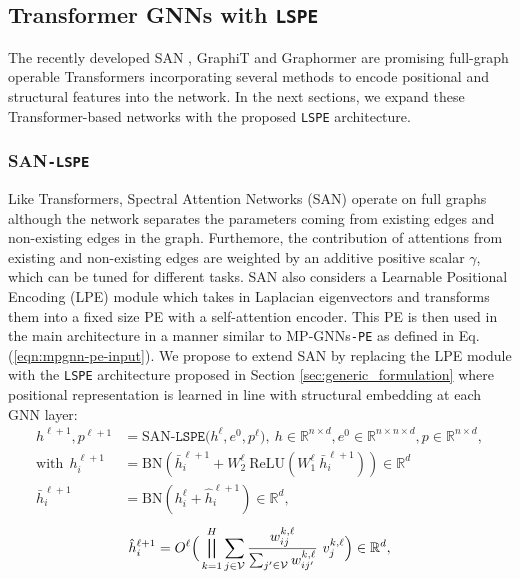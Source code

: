 \documentclass{article} \usepackage{iclr2021_conference,times}
\begin{document}
\subsection{Transformer GNNs with \texttt{LSPE}}
\label{sec:transformer_lspe}

The recently developed SAN \citep{kreuzer2021rethinking}, GraphiT \citep{mialon2021graphit} and Graphormer \citep{ying2021transformers} are promising full-graph operable Transformers incorporating several methods to encode positional and structural features into the network. In the next sections, we expand these Transformer-based networks with the proposed \texttt{LSPE} architecture.



\subsubsection{SAN\texttt{-LSPE}}
\label{sec:san_lspe}
Like Transformers, Spectral Attention Networks (SAN) \citep{kreuzer2021rethinking} operate on full graphs although the network separates the parameters coming from existing edges and non-existing edges in the graph. Furthemore, the contribution of attentions from existing and non-existing edges are weighted by an additive positive scalar $\gamma$, which can be tuned for different tasks. SAN also considers a Learnable Positional Encoding (LPE) module which takes in Laplacian eigenvectors and transforms them into a fixed size PE with a self-attention encoder. This PE is then used in the main architecture in a manner similar to MP-GNNs\texttt{-PE} as defined in Eq. (\ref{eqn:mpgnn-pe-input}). We propose to extend SAN by replacing the LPE module with the \texttt{LSPE} architecture proposed in Section \ref{sec:generic_formulation} where positional representation is learned in line with structural embedding at each GNN layer:
\begin{align}
h^{\ell+1}, p^{\ell+1} &= \text{SAN}\texttt{-LSPE}\Big(h^{\ell}, e^0, p^{\ell}\Big), \ h\in\mathbb{R}^{n\times d}, e^0\in\mathbb{R}^{n\times n\times d}, p\in\mathbb{R}^{n\times d},\label{eqn:san_lspe_1}\\
\text{with} \ \ h_{i}^{\ell+1}&=\text{BN}\left(\bar{h}_{i}^{\ell+1}+  W_{2}^{\ell}\ \text{ReLU}\left( W_{1}^{\ell}\ \bar{h}_{i}^{\ell+1} \right) \right)\in\mathbb{R}^{d}\\
\bar{h}_{i}^{\ell+1}&=\text{BN}\left(h_{i}^{\ell}+\hat{h}_{i}^{\ell+1}\right)\in\mathbb{R}^{d},\label{eqn:san_lspe_2}
\end{align}
\begin{eqnarray}
\hat{{h}}_{i}^{\ell+1}= O^{\ell}\Big(\bigparallel_{k=1}^{H}\sum_{j \in \mathcal{V}} \frac{w_{ij}^{k, \ell}}{\sum_{j' \in \mathcal{V}} w_{ij'}^{k, \ell}} \ v_j^{k,\ell} \Big)\in\mathbb{R}^{d},\label{eqn:san_lspe_3}
\end{eqnarray}
\end{document}
